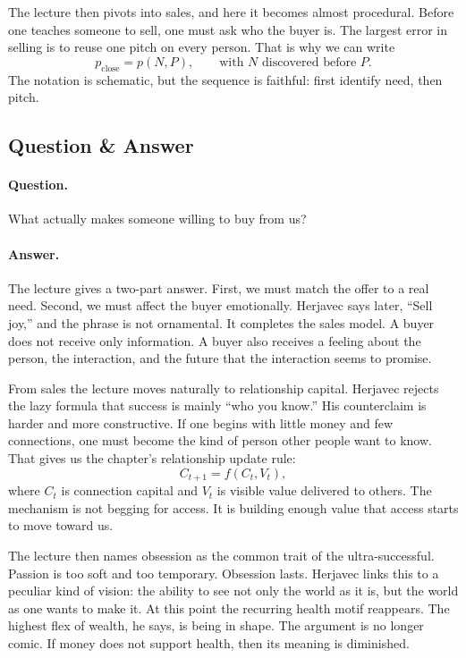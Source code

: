 The lecture then pivots into sales, and here it becomes almost procedural. Before one teaches someone to sell, one must ask who the buyer is. The largest error in selling is to reuse one pitch on every person. That is why we can write
\begin{equation}
p_{\mathrm{close}} = p(N,P),
\qquad
\text{with } N \text{ discovered before } P.
\end{equation}
The notation is schematic, but the sequence is faithful: first identify need, then pitch.

\subsection{Question \& Answer}

\paragraph{Question.} What actually makes someone willing to buy from us?

\paragraph{Answer.} The lecture gives a two-part answer. First, we must match the offer to a real need. Second, we must affect the buyer emotionally. Herjavec says later, ``Sell joy,'' and the phrase is not ornamental. It completes the sales model. A buyer does not receive only information. A buyer also receives a feeling about the person, the interaction, and the future that the interaction seems to promise.

From sales the lecture moves naturally to relationship capital. Herjavec rejects the lazy formula that success is mainly ``who you know.'' His counterclaim is harder and more constructive. If one begins with little money and few connections, one must become the kind of person other people want to know. That gives us the chapter's relationship update rule:
\begin{equation}
C_{t+1} = f(C_t, V_t),
\end{equation}
where \(C_t\) is connection capital and \(V_t\) is visible value delivered to others. The mechanism is not begging for access. It is building enough value that access starts to move toward us.

The lecture then names obsession as the common trait of the ultra-successful. Passion is too soft and too temporary. Obsession lasts. Herjavec links this to a peculiar kind of vision: the ability to see not only the world as it is, but the world as one wants to make it. At this point the recurring health motif reappears. The highest flex of wealth, he says, is being in shape. The argument is no longer comic. If money does not support health, then its meaning is diminished.

